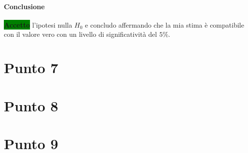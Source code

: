 \documentclass{article}
\begin{document}
	
	

	\paragraph{Conclusione}  \colorbox{green}{\textbf{Accetto}} l'ipotesi nulla $H_{0}$ e concludo affermando che la mia stima è compatibile con il valore vero con un livello di significatività del $5\%$.
	
	
	
	\newpage
	\section{Punto 7}
	\newpage
	\section{Punto 8}
	
	\newpage
	\section{Punto 9}
	
	
	
\end{document}
